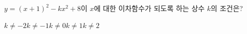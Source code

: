 $y=(x+1)^2-kx^2+8$이 $x$에 대한 이차함수가 되도록 하는 상수 $k$의 조건은?
\begin{choices32}{$k\neq-2$}{$k\neq-1$}{$k\neq0$}{$k\neq1$}{$k\neq2$}\end{choices32}
